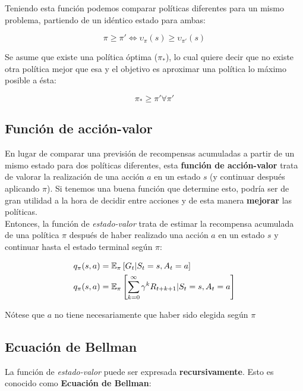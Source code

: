 \documentclass[11pt,fleqn]{book} %
\begin{document}
Teniendo esta función podemos comparar políticas diferentes para un mismo problema, partiendo de un idéntico estado para ambas:

\begin{equation}
\pi\geq\pi'\iff\upsilon_\pi(s)\geq\upsilon_{\pi'}(s) 
\end{equation}

Se asume que existe una política óptima ($\pi_*$), lo cual quiere decir que no existe otra política mejor que esa y el objetivo es aproximar una política lo máximo posible a ésta:

\begin{equation}
\pi_* \geq \pi' \forall \pi'
\end{equation}

\subsection{Función de acción-valor}

En lugar de comparar una previsión de recompensas acumuladas a partir de un mismo estado para dos políticas diferentes, esta \textbf{función de acción-valor} trata de valorar la realización de una acción $a$ en un estado $s$ (y continuar después aplicando $\pi$). Si tenemos una buena función que determine esto, podría ser de gran utilidad a la hora de decidir entre acciones y de esta manera \textbf{mejorar} las políticas. \\

Entonces, la función de \textit{estado-valor} trata de estimar la recompensa acumulada de una política $\pi$ después de haber realizado una acción $a$ en un estado $s$ y continuar hasta el estado terminal según $\pi$:

\begin{align}
\begin{split}
q_\pi(s,a)&=\mathbb{E}_\pi\left[G_t|S_t=s,A_t=a\right]\\
q_\pi(s,a)&=\mathbb{E}_\pi\left[\sum^\infty_{k=0}\gamma^kR_{t+k+1}|S_t=s,A_t=a\right]
\end{split}
\end{align}

Nótese que $a$ no tiene necesariamente que haber sido elegida según $\pi$

\subsection{Ecuación de Bellman}\label{sec:bellman}

La función de \textit{estado-valor} puede ser expresada \textbf{recursivamente}. Esto es conocido como \textbf{Ecuación de Bellman}:
\end{document}
